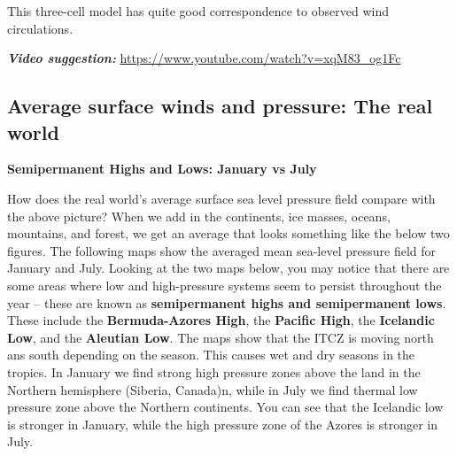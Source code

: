\documentclass[12pt,oneside]{book}
\begin{document}
This three-cell model has quite good correspondence to observed wind
circulations.

\textbf{\emph{Video suggestion:}}
\url{https://www.youtube.com/watch?v=xqM83_og1Fc}

\subsection{Average surface winds and pressure: The real
world}\label{average-surface-winds-and-pressure-the-real-world}

\textbf{Semipermanent Highs and Lows: January vs July}

How does the real world's average surface sea level pressure field
compare with the above picture? When we add in the continents, ice
masses, oceans, mountains, and forest, we get an average that looks
something like the below two figures. The following maps show the
averaged mean sea-level pressure field for January and July. Looking at
the two maps below, you may notice that there are some areas where low
and high-pressure systems seem to persist throughout the year -- these
are known as \textbf{semipermanent highs and semipermanent lows}. These
include the \textbf{Bermuda-Azores High}, the \textbf{Pacific High}, the
\textbf{Icelandic Low}, and the \textbf{Aleutian Low}. The maps show
that the ITCZ is moving north ans south depending on the season. This
causes wet and dry seasons in the tropics. In January we find strong
high pressure zones above the land in the Northern hemisphere (Siberia,
Canada)n, while in July we find thermal low pressure zone above the
Northern continents. You can see that the Icelandic low is stronger in
January, while the high pressure zone of the Azores is stronger in July.
\end{document}
